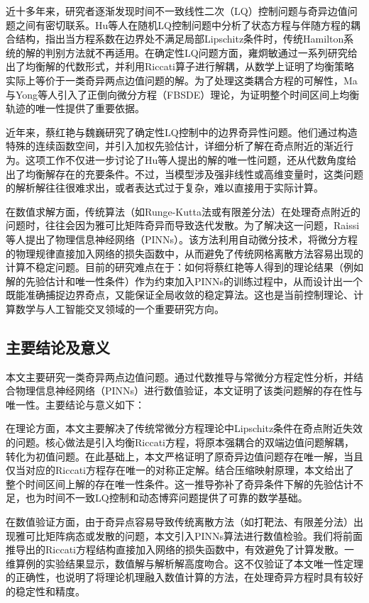 \documentclass{GZUbachelorthesis}
\begin{document}
近十多年来，研究者逐渐发现时间不一致线性二次（LQ）控制问题与奇异边值问题之间有密切联系。Hu等人\cite{hu2012time, hu2017characterization}在随机LQ控制问题中分析了状态方程与伴随方程的耦合结构，指出当方程系数在边界处不满足局部Lipschitz条件时，传统Hamilton系统的解的判别方法就不再适用。在确定性LQ问题方面，雍炯敏\cite{yong2012deterministic}通过一系列研究给出了均衡解的代数形式，并利用Riccati算子进行解耦，从数学上证明了均衡策略实际上等价于一类奇异两点边值问题的解。为了处理这类耦合方程的可解性，Ma与Yong\cite{ma1994solving}等人引入了正倒向微分方程（FBSDE）理论，为证明整个时间区间上均衡轨迹的唯一性提供了重要依据。

近年来，蔡红艳与魏巍\cite{cai2022time}研究了确定性LQ控制中的边界奇异性问题。他们通过构造特殊的连续函数空间，并引入加权先验估计，详细分析了解在奇点附近的渐近行为。这项工作不仅进一步讨论了Hu等人提出的解的唯一性问题，还从代数角度给出了均衡解存在的充要条件。不过，当模型涉及强非线性或高维变量时，这类问题的解析解往往很难求出，或者表达式过于复杂，难以直接用于实际计算。

在数值求解方面，传统算法（如Runge-Kutta法或有限差分法）在处理奇点附近的问题时，往往会因为雅可比矩阵奇异而导致迭代发散。为了解决这一问题，Raissi等人\cite{raissi2019physics}提出了物理信息神经网络（PINNs）。该方法利用自动微分技术，将微分方程的物理规律直接加入网络的损失函数中，从而避免了传统网格离散方法容易出现的计算不稳定问题\cite{karniadakis2021physics}。目前的研究难点在于：如何将蔡红艳等人得到的理论结果（例如解的先验估计和唯一性条件）作为约束加入PINNs的训练过程中，从而设计出一个既能准确捕捉边界奇点，又能保证全局收敛的稳定算法。这也是当前控制理论、计算数学与人工智能交叉领域的一个重要研究方向。

\subsection{主要结论及意义}

本文主要研究一类奇异两点边值问题。通过代数推导与常微分方程定性分析，并结合物理信息神经网络（PINNs）进行数值验证，本文证明了该类问题解的存在性与唯一性。主要结论与意义如下：

在理论方面，本文主要解决了传统常微分方程理论中Lipschitz条件在奇点附近失效的问题。核心做法是引入均衡Riccati方程，将原本强耦合的双端边值问题解耦，转化为初值问题。在此基础上，本文严格证明了原奇异边值问题存在唯一解，当且仅当对应的Riccati方程存在唯一的对称正定解。结合压缩映射原理，本文给出了整个时间区间上解的存在唯一性条件。这一推导弥补了奇异条件下解的先验估计不足，也为时间不一致LQ控制和动态博弈问题提供了可靠的数学基础。

在数值验证方面，由于奇异点容易导致传统离散方法（如打靶法、有限差分法）出现雅可比矩阵病态或发散的问题，本文引入PINNs算法进行数值检验。我们将前面推导出的Riccati方程结构直接加入网络的损失函数中，有效避免了计算发散。一维算例的实验结果显示，数值解与解析解高度吻合。这不仅验证了本文唯一性定理的正确性，也说明了将理论机理融入数值计算的方法，在处理奇异方程时具有较好的稳定性和精度。
\end{document}
